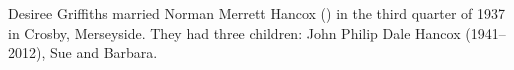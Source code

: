 
Desiree Griffiths married Norman Merrett Hancox () in the third quarter of 1937 in Crosby, Merseyside. \cite{NMHancoxMarriage}   They had three children: John Philip Dale Hancox (1941--2012), Sue and Barbara.



